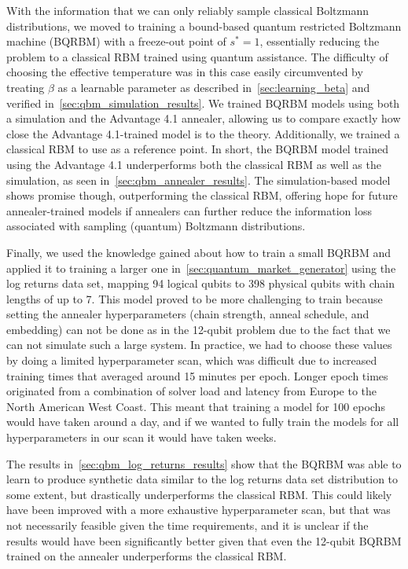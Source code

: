 With the information that we can only reliably sample classical Boltzmann distributions, we moved to training a bound-based quantum restricted Boltzmann machine (BQRBM) with a freeze-out point of \( s^* = 1 \), essentially reducing the problem to a classical RBM trained using quantum assistance.
The difficulty of choosing the effective temperature was in this case easily circumvented by treating \( \beta \) as a learnable parameter as described in~\cref{sec:learning_beta} and verified in~\cref{sec:qbm_simulation_results}.
We trained BQRBM models using both a simulation and the Advantage 4.1 annealer, allowing us to compare exactly how close the Advantage 4.1-trained model is to the theory.
Additionally, we trained a classical RBM to use as a reference point.
In short, the BQRBM model trained using the Advantage 4.1 underperforms both the classical RBM as well as the simulation, as seen in~\cref{sec:qbm_annealer_results}.
The simulation-based model shows promise though, outperforming the classical RBM, offering hope for future annealer-trained models if annealers can further reduce the information loss associated with sampling (quantum) Boltzmann distributions.

Finally, we used the knowledge gained about how to train a small BQRBM and applied it to training a larger one in~\cref{sec:quantum_market_generator} using the log returns data set, mapping 94 logical qubits to 398 physical qubits with chain lengths of up to 7.
This model proved to be more challenging to train because setting the annealer hyperparameters (chain strength, anneal schedule, and embedding) can not be done as in the 12-qubit problem due to the fact that we can not simulate such a large system.
In practice, we had to choose these values by doing a limited hyperparameter scan, which was difficult due to increased training times that averaged around 15 minutes per epoch.
Longer epoch times originated from a combination of solver load and latency from Europe to the North American West Coast.
This meant that training a model for 100 epochs would have taken around a day, and if we wanted to fully train the models for all hyperparameters in our scan it would have taken weeks.

The results in~\cref{sec:qbm_log_returns_results} show that the BQRBM was able to learn to produce synthetic data similar to the log returns data set distribution to some extent, but drastically underperforms the classical RBM.
This could likely have been improved with a more exhaustive hyperparameter scan, but that was not necessarily feasible given the time requirements, and it is unclear if the results would have been significantly better given that even the 12-qubit BQRBM trained on the annealer underperforms the classical RBM.

